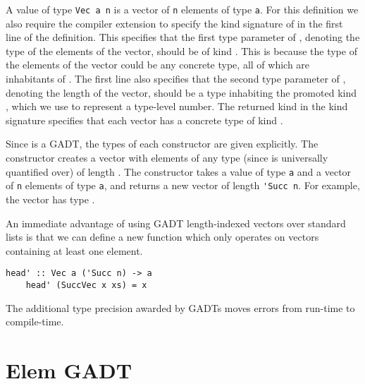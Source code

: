 \newcommand{\veccode}{\lstinline[morekeywords={a, n}]}

A value of type \veccode{Vec a n} is a vector of \veccode{n} elements of type \veccode{a}. For this definition we also require the  compiler extension to specify the kind signature of  in the first line of the definition. This specifies that the first type parameter of , denoting the type of the elements of the vector, should be of kind \code{*}. This is because the type of the elements of the vector could be any concrete type, all of which are inhabitants of \code{*}. The first line also specifies that the second type parameter of , denoting the length of the vector, should be a type inhabiting the promoted kind , which we use to represent a type-level number. The returned kind \code{*} in the kind signature specifies that each vector has a concrete type of kind \code{*}.

Since  is a GADT, the types of each constructor are given explicitly. The  constructor creates a vector with elements of any type (since  is universally quantified over) of length . The  constructor takes a value of type \veccode{a} and a vector of \veccode{n} elements of type \veccode{a}, and returns a new vector of length \veccode{'Succ n}. For example, the vector  has type .

An immediate advantage of using GADT length-indexed vectors over standard lists is that we can define a new function  which only operates on vectors containing at least one element. 

\begin{lstlisting}[morekeywords={a, n}]
    head' :: Vec a ('Succ n) -> a
    head' (SuccVec x xs) = x
\end{lstlisting}

The additional type precision awarded by GADTs moves errors from run-time to compile-time.


\section{Elem GADT}

\newcommand{\elemcode}{\lstinline[morekeywords={a, [a], x, xs, y}]}

